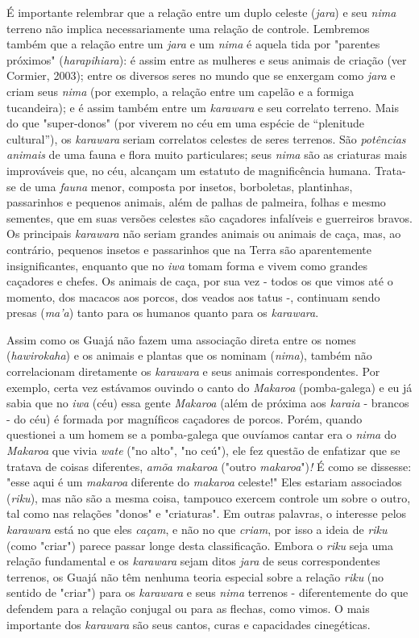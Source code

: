É importante relembrar que a relação entre um duplo celeste
(\emph{jara}) e seu \emph{nima} terreno não implica necessariamente uma
relação de controle. Lembremos também que a relação entre um \emph{jara}
e um \emph{nima} é aquela tida por "parentes próximos"
(\emph{harapihiara}): é assim entre as mulheres e seus animais de
criação (ver Cormier, 2003); entre os diversos seres no mundo que se
enxergam como \emph{jara} e criam seus \emph{nima} (por exemplo, a
relação entre um capelão e a formiga tucandeira); e é assim também entre
um \emph{karawara} e seu correlato terreno. Mais do que "super-donos"
(por viverem no céu em uma espécie de ``plenitude cultural''), os
\emph{karawara} seriam correlatos celestes de seres terrenos. São
\emph{potências animais} de uma fauna e flora muito particulares; seus
\emph{nima} são as criaturas mais improváveis que, no céu, alcançam um
estatuto de magnificência humana. Trata-se de uma \emph{fauna} menor,
composta por insetos, borboletas, plantinhas, passarinhos e pequenos
animais, além de palhas de palmeira, folhas e mesmo sementes, que em
suas versões celestes são caçadores infalíveis e guerreiros bravos. Os
principais \emph{karawara} não seriam grandes animais ou animais de
caça, mas, ao contrário, pequenos insetos e passarinhos que na Terra são
aparentemente insignificantes, enquanto que no \emph{iwa} tomam forma e
vivem como grandes caçadores e chefes. Os animais de caça, por sua vez -
todos os que vimos até o momento, dos macacos aos porcos, dos veados aos
tatus -, continuam sendo presas (\emph{ma'a}) tanto para os humanos
quanto para os \emph{karawara}.

Assim como os Guajá não fazem uma associação direta entre os nomes
(\emph{hawirokaha}) e os animais e plantas que os nominam (\emph{nima}),
também não correlacionam diretamente os \emph{karawara} e seus animais
correspondentes. Por exemplo, certa vez estávamos ouvindo o canto do
\emph{Makaroa} (pomba-galega) e eu já sabia que no \emph{iwa} (céu) essa
gente \emph{Makaroa} (além de próxima aos \emph{karaia} - brancos - do
céu) é formada por magníficos caçadores de porcos. Porém, quando
questionei a um homem se a pomba-galega que ouvíamos cantar era o
\emph{nima} do \emph{Makaroa} que vivia \emph{wate} ("no alto", "no
ceú"), ele fez questão de enfatizar que se tratava de coisas diferentes,
\emph{amõa} \emph{makaroa} ("outro \emph{makaroa}")\emph{!} É como se
dissesse: "esse aqui é um \emph{makaroa} diferente do \emph{makaroa}
celeste!" Eles estariam associados (\emph{riku}), mas não são a mesma
coisa, tampouco exercem controle um sobre o outro, tal como nas relações
"donos" e "criaturas". Em outras palavras, o interesse pelos
\emph{karawara} está no que eles \emph{caçam}, e não no que
\emph{criam}, por isso a ideia de \emph{riku} (como "criar") parece
passar longe desta classificação. Embora o \emph{riku} seja uma relação
fundamental e os \emph{karawara} sejam ditos \emph{jara} de seus
correspondentes terrenos, os Guajá não têm nenhuma teoria especial sobre
a relação \emph{riku} (no sentido de "criar") para os \emph{karawara} e
seus \emph{nima} terrenos - diferentemente do que defendem para a
relação conjugal ou para as flechas, como vimos. O mais importante dos
\emph{karawara} são seus cantos, curas e capacidades cinegéticas.

